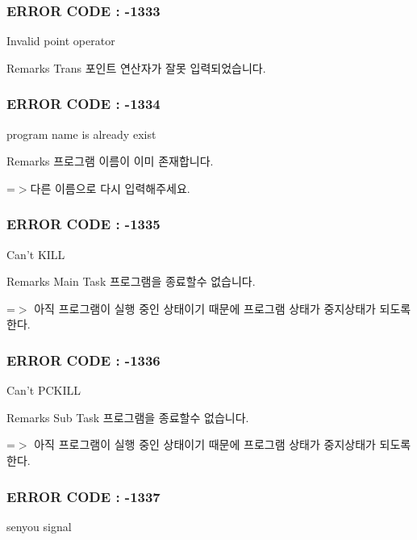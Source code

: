  \subsubsection*{E\-R\-R\-O\-R C\-O\-D\-E \-: -\/1333 }

Invalid point operator \begin{DoxyRemark}{Remarks}
Trans 포인트 연산자가 잘못 입력되었습니다.
\end{DoxyRemark}


 \subsubsection*{E\-R\-R\-O\-R C\-O\-D\-E \-: -\/1334 }

program name is already exist \begin{DoxyRemark}{Remarks}
프로그램 이름이 이미 존재합니다. \par
 =$>$다른 이름으로 다시 입력해주세요.
\end{DoxyRemark}


 \subsubsection*{E\-R\-R\-O\-R C\-O\-D\-E \-: -\/1335 }

Can't K\-I\-L\-L \begin{DoxyRemark}{Remarks}
Main Task 프로그램을 종료할수 없습니다. \par
 =$>$ 아직 프로그램이 실행 중인 상태이기 때문에 프로그램 상태가 중지상태가 되도록 한다.
\end{DoxyRemark}


 \subsubsection*{E\-R\-R\-O\-R C\-O\-D\-E \-: -\/1336 }

Can't P\-C\-K\-I\-L\-L \begin{DoxyRemark}{Remarks}
Sub Task 프로그램을 종료할수 없습니다. \par
 =$>$ 아직 프로그램이 실행 중인 상태이기 때문에 프로그램 상태가 중지상태가 되도록 한다.
\end{DoxyRemark}


 \subsubsection*{E\-R\-R\-O\-R C\-O\-D\-E \-: -\/1337 }

senyou signal



